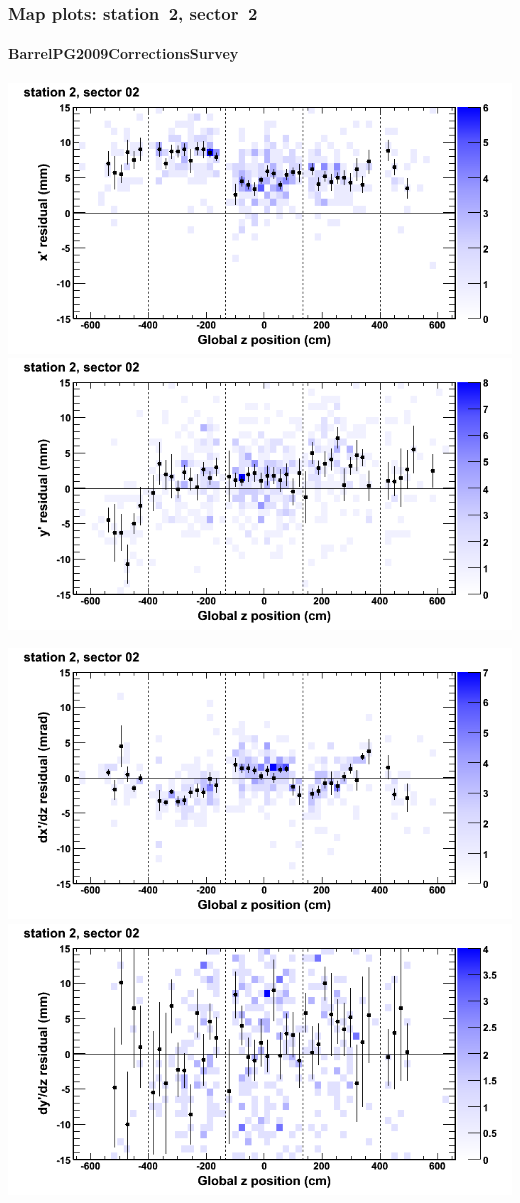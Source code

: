 \documentclass[compress]{beamer}
\begin{document}
\begin{frame}
\frametitle{Map plots: station~2, sector~2}
\framesubtitle{BarrelPG2009CorrectionsSurvey}
\includegraphics[width=0.5\linewidth]{mapplots_01/DTvsz_st2sec02_x.png}
\includegraphics[width=0.5\linewidth]{mapplots_01/DTvsz_st2sec02_y.png}

\includegraphics[width=0.5\linewidth]{mapplots_01/DTvsz_st2sec02_dxdz.png}
\includegraphics[width=0.5\linewidth]{mapplots_01/DTvsz_st2sec02_dydz.png}
\end{frame}
\end{document}
